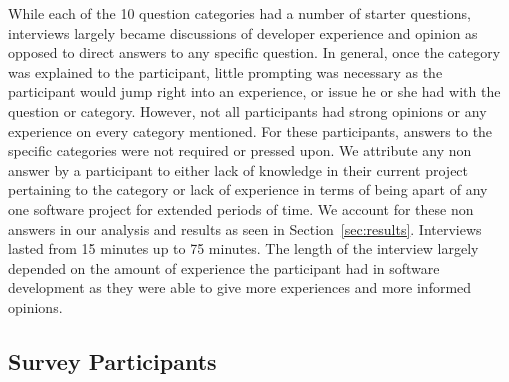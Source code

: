 \documentclass[conference]{IEEEtran}
\newcommand{\totalCategories}{10}
\begin{document}
While each of the \totalCategories{} question categories had a number of starter questions, interviews 
largely became discussions of developer experience and opinion as opposed to direct answers to any specific question.
In general, once the category was explained to the participant, little prompting was necessary as the participant
would jump right into an experience, or issue he or she had with the question or category. However, not all
participants had strong opinions or any experience on every category mentioned. For these participants, answers 
to the specific categories were not required or pressed upon. We attribute any non answer by a participant to
either lack of knowledge in their current project pertaining to the category or lack of experience in terms of
being apart of any one software project for extended periods of time. We account for these non answers
in our analysis and results as seen in Section~\ref{sec:results}. Interviews lasted 
from 15 minutes up to 75 minutes. The length of the interview largely depended on the amount of experience the
participant had in software development as they were able to give more experiences and more informed opinions.


\subsection{Survey Participants}
\end{document}
